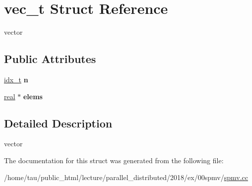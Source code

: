 \hypertarget{structvec__t}{}\section{vec\+\_\+t Struct Reference}
\label{structvec__t}


vector  


\subsection*{Public Attributes}
\begin{DoxyCompactItemize}
\item 
\mbox{\label{structvec__t_a06879ff4054298fbc680b02e3e18da7a}} 
\hyperlink{spmv_8cc_a8e93478a00e685bea5e6a3f617bf03a3}{idx\+\_\+t} {\bfseries n}
\item 
\mbox{\label{structvec__t_a7d62f0b683ab0558903c5227d670ac1a}} 
\hyperlink{spmv_8cc_a11d147c64891830c9e79b3315b1b2e21}{real} $\ast$ {\bfseries elems}
\end{DoxyCompactItemize}


\subsection{Detailed Description}
vector 

The documentation for this struct was generated from the following file\+:\begin{DoxyCompactItemize}
\item 
/home/tau/public\+\_\+html/lecture/parallel\+\_\+distributed/2018/ex/00spmv/\hyperlink{spmv_8cc}{spmv.\+cc}\end{DoxyCompactItemize}
